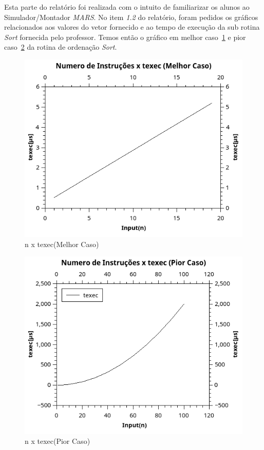 \documentclass[12pt]{article}
\begin{document}
Esta parte do relatório foi realizada com o intuito de familiarizar os alunos ao Simulador/Montador \textit{MARS}. No item \textit{1.2} do relatório, foram pedidos os gráficos relacionados aos valores do vetor fornecido e ao tempo de execução da sub rotina \textit{Sort} fornecida pelo professor. Temos então o gráfico em melhor caso~\ref{fig:txnMC} e pior caso~\ref{fig:txnPC} da rotina de ordenação \textit{Sort}.

\begin{figure}[H]
	\centering
	\includegraphics[width=.8\textwidth]{txnMC.png}
	\caption{n x texec(Melhor Caso)}
	\label{fig:txnMC}
\end{figure}

\begin{figure}[H]
	\centering
	\includegraphics[width=.8\textwidth]{txnPC.png}
	\caption{n x texec(Pior Caso)}
	\label{fig:txnPC}
\end{figure}
\end{document}
